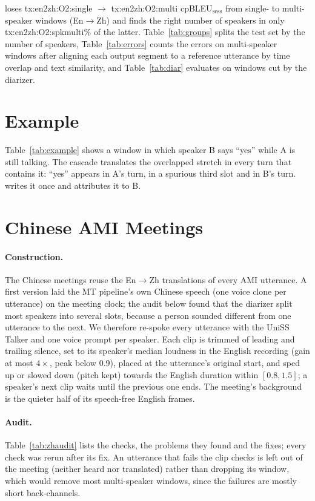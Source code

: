 \sys{} loses \num{tx:en2zh:O2:single} $\rightarrow$ \num{tx:en2zh:O2:multi} cpBLEU$_\text{sess}$ from single- to
multi-speaker windows (En$\rightarrow$Zh) and finds the right number of speakers in only \num{tx:en2zh:O2:spkmulti}\% of
the latter. Table~\ref{tab:groups} splits the test set by the number of speakers, Table~\ref{tab:errors} counts the errors on
multi-speaker windows after aligning each output segment to a reference utterance by time overlap and text
similarity, and Table~\ref{tab:diar} evaluates on windows cut by the diarizer.

\section{Example}
\label{app:example}

Table~\ref{tab:example} shows a window in which speaker B says ``yes'' while A is still talking. The cascade translates
the overlapped stretch in every turn that contains it: ``yes'' appears in A's turn, in a spurious third slot and in B's
turn. \sys{} writes it once and attributes it to B.



\section{Chinese AMI Meetings}
\label{app:zhdata}

\paragraph{Construction.} The Chinese meetings reuse the En$\rightarrow$Zh translations of every AMI utterance. A first
version laid the MT pipeline's own Chinese speech (one voice clone per utterance) on the meeting clock; the audit below
found that the diarizer split most speakers into several slots, because a person sounded different from one utterance
to the next. We therefore re-spoke every utterance with the UniSS Talker and one voice prompt per speaker. Each clip is
trimmed of leading and trailing silence, set to its speaker's median loudness in the English recording (gain at most
$4\times$, peak below 0.9), placed at the utterance's original start, and sped up or slowed down (pitch kept) towards the
English duration within $[0.8, 1.5]$; a speaker's next clip waits until the previous one ends. The meeting's background
is the quieter half of its speech-free English frames.

\paragraph{Audit.} Table~\ref{tab:zhaudit} lists the checks, the problems they found and the fixes; every check was rerun
after its fix. An utterance that fails the clip checks is left out of the meeting (neither heard nor translated) rather
than dropping its window, which would remove most multi-speaker windows, since the failures are mostly short
back-channels.

